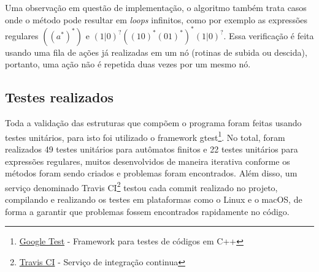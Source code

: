 \documentclass{article}
\begin{document}
            Uma observação em questão de implementação, o algoritmo também
            trata casos onde o método pode resultar em \textit{loops}
            infinitos, como por exemplo as expressões regulares $((a^{*})^{*})$
            e $(1|0)^{?}((10)^{*}(01)^{*})^{*}(1|0)^{?}$. Essa verificação é
            feita usando uma fila de ações já realizadas em um nó (rotinas de
            subida ou descida), portanto, uma ação não é repetida duas vezes
            por um mesmo nó.

    \subsection{Testes realizados}
        Toda a validação das estruturas que compõem o programa foram feitas
        usando testes unitários, para isto foi utilizado o framework
        gtest\footnote{\href{https://github.com/google/googletest}{Google Test}
        - Framework para testes de códigos em C++}. No total, foram realizados
        49 testes unitários para autômatos finitos e 22 testes unitários para
        expressões regulares, muitos desenvolvidos de maneira iterativa
        conforme os métodos foram sendo criados e problemas foram encontrados.
        Além disso, um serviço denominado Travis
        CI\footnote{\href{https://travis-ci.com}{Travis CI} - Serviço de
        integração continua} testou cada commit realizado no projeto,
        compilando e realizando os testes em plataformas como o Linux e o
        macOS, de forma a garantir que problemas fossem encontrados rapidamente
        no código.
\end{document}
